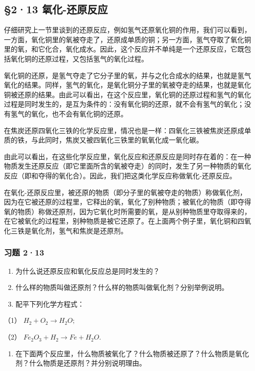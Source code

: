 \subsection{§2·13 氧化-还原反应}

仔细研究上一节里谈到的还原反应，例如氢气还原氧化铜的作用，我们可以看到，一方面，氧化铜里的氧被夺走了，还原成单质的铜；另一方面，氢气夺取了氧化铜里的氧，和它化合，氧化成水。因此，这个反应并不单纯是一个还原反应，它既包括氧化铜的还原过程，又包括氢气的氧化过程。

氧化铜的还原，是氢气夺走了它分子里的氧，并与之化合成水的结果，也就是氢气氧化的结果。同样，氢气的氧化，是氧化铜分子里的氧被夺走的结果，也就是氧化铜被还原的结果。由此可以看出，在这个反应里，氧化铜的还原过程和氢气的氧化过程是同时发生的，是互为条件的：没有氧化铜的还原，就不会有氢气的氧化；没有氢气的氧化，也不会有氧化铜的还原。

在焦炭还原四氧化三铁的化学反应里，情况也是一样：四氧化三铁被焦炭还原成单质的铁，与此同时，焦炭又被四氧化三铁里的氧氧化成一氧化碳。

由此可以看出，在这些化学反应里，氧化反应和还原反应是同时存在着的：在一种物质发生还原反应（即它里面所含的氧被夺走）的同时，发生了另一种物质的氧化反应（即和夺得的氧化合）。因此，我们把这类化学反应称做氧化-还原反应。

在氧化-还原反应里，被还原的物质（即分子里的氧被夺走的物质）称做氧化剂，因为在它被还原的过程里，它释出的氧，氧化了别种物质；被氧化的物质（即夺得氧的物质）称做还原剂，因为它氧化时所需要的氧，是从别种物质里夺取得来的，在它被氧化的过程里，别种物质是被它还原了。在上面两个例子里，氧化铜和四氧化三铁是氧化剂，氢气和焦炭是还原剂。

\subsubsection{习题 2·13}

\begin{enumerate}
\item
  为什么说还原反应和氧化反应总是同时发生的？
\item
  什么样的物质叫做还原剂？什么样的物质叫做氧化剂？分别举例说明。
\item
  配平下列化学方程式：
\end{enumerate}

（1） \(H_{2} + O_{2} \longrightarrow H_{2}O;\)

（2） \(Fe_{2}O_{3} + H_{2} \longrightarrow Fe + H_{2}O.\)

\begin{enumerate}[start=4]
\item
  在下面两个反应里，什么物质被氧化了？什么物质被还原了？什么物质是氧化剂？什么物质是还原剂？并分别说明理由。
\end{enumerate}

